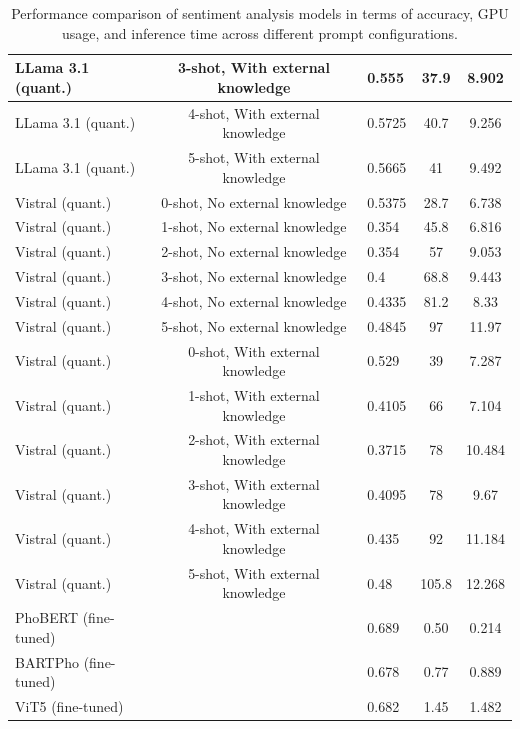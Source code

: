 {\begin{table}[htbp]
\begin{center}
\begin{tabular}{|l|c|l|c|c|}
      \hline LLama 3.1 (quant.) & 3-shot, With external knowledge	 & 0.555 & 37.9 & 8.902\\
      \hline LLama 3.1 (quant.) & 4-shot, With external knowledge	 & 0.5725 & 40.7 & 9.256\\
      \hline LLama 3.1 (quant.) & 5-shot, With external knowledge	 & 0.5665 & 41 & 9.492\\
      \hline Vistral (quant.)  & 0-shot, No external knowledge & 0.5375 & 28.7 & 6.738\\
      \hline Vistral (quant.)  & 1-shot, No external knowledge & 0.354 & 45.8 & 6.816\\
      \hline Vistral (quant.)  & 2-shot, No external knowledge & 0.354 & 57 & 9.053\\
      \hline Vistral (quant.)  & 3-shot, No external knowledge & 0.4 & 68.8 & 9.443\\
      \hline Vistral (quant.)  & 4-shot, No external knowledge & 0.4335 & 81.2 & 8.33\\
      \hline Vistral (quant.)  & 5-shot, No external knowledge & 0.4845 & 97 & 11.97\\
      \hline Vistral (quant.)  & 0-shot, With external knowledge & 0.529 & 39 & 7.287\\
      \hline Vistral (quant.)  & 1-shot, With external knowledge & 0.4105 & 66 & 7.104\\
      \hline Vistral (quant.)  & 2-shot, With external knowledge & 0.3715 & 78 & 10.484\\
      \hline Vistral (quant.)  & 3-shot, With external knowledge & 0.4095 & 78 & 9.67\\
      \hline Vistral (quant.)  & 4-shot, With external knowledge & 0.435 & 92 & 11.184\\
      \hline Vistral (quant.)  & 5-shot, With external knowledge & 0.48 & 105.8 & 12.268\\
      \hline PhoBERT (fine-tuned)  &  & 0.689 & 0.50 & 0.214\\
      \hline BARTPho (fine-tuned) &  & 0.678 & 0.77 & 0.889\\
      \hline ViT5 (fine-tuned)  &  & 0.682 & 1.45 & 1.482\\
      \hline
    \end{tabular}%
  \end{center}
  \caption{\small Performance comparison of sentiment analysis models in terms of accuracy, GPU usage, and inference time across different prompt configurations.} 
  \label{tab:results}
\end{table}

}
